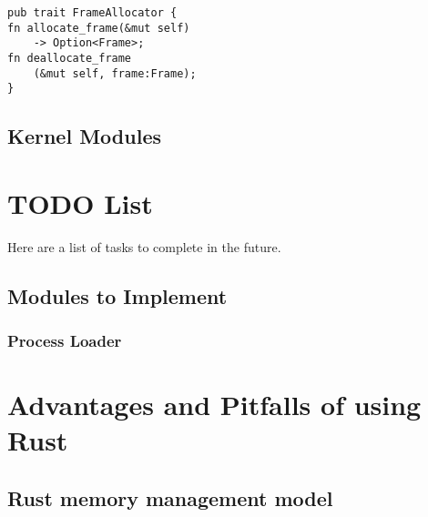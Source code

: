 \documentclass[conference]{IEEEtran}
\begin{document}
\begin{verbatim}
pub trait FrameAllocator {
fn allocate_frame(&mut self) 
    -> Option<Frame>;
fn deallocate_frame
    (&mut self, frame:Frame);
}
\end{verbatim}

\subsection{Kernel Modules}

\section{TODO List}

Here are a list of tasks to complete in the future.

\subsection{Modules to Implement}

\subsubsection{Process Loader}


\section{Advantages and Pitfalls of using Rust}

\subsection{Rust memory management model}

%
%
\end{document}
